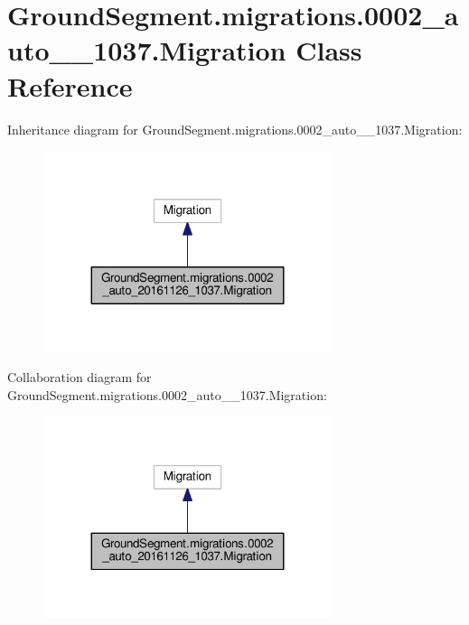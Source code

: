 \hypertarget{class_ground_segment_1_1migrations_1_10002__auto__20161126__1037_1_1_migration}{}\section{Ground\+Segment.\+migrations.0002\+\_\+auto\+\_\+\_\+1037.Migration Class Reference}
\label{class_ground_segment_1_1migrations_1_10002__auto__20161126__1037_1_1_migration}


Inheritance diagram for Ground\+Segment.\+migrations.0002\+\_\+auto\+\_\+\_\+1037.Migration\+:\nopagebreak
\begin{figure}[H]
\begin{center}
\leavevmode
\includegraphics[width=239pt]{class_ground_segment_1_1migrations_1_10002__auto__20161126__1037_1_1_migration__inherit__graph}
\end{center}
\end{figure}


Collaboration diagram for Ground\+Segment.\+migrations.0002\+\_\+auto\+\_\+\_\+1037.Migration\+:\nopagebreak
\begin{figure}[H]
\begin{center}
\leavevmode
\includegraphics[width=239pt]{class_ground_segment_1_1migrations_1_10002__auto__20161126__1037_1_1_migration__coll__graph}
\end{center}
\end{figure}
